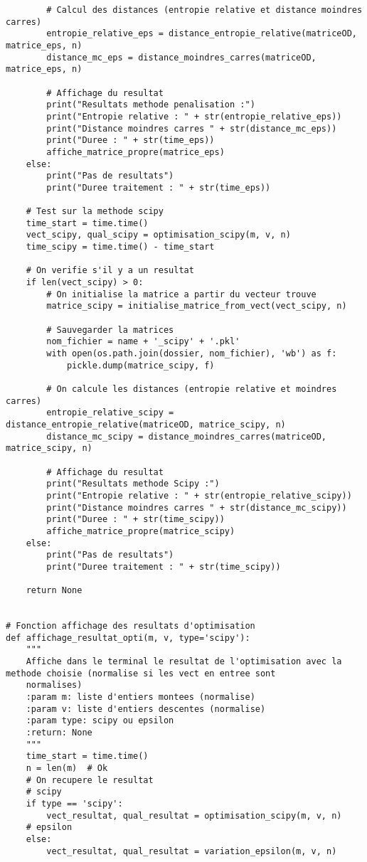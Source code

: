 \documentclass[12pt]{article}
\begin{document}
\begin{lstlisting}
        # Calcul des distances (entropie relative et distance moindres carres)
        entropie_relative_eps = distance_entropie_relative(matriceOD, matrice_eps, n)
        distance_mc_eps = distance_moindres_carres(matriceOD, matrice_eps, n)

        # Affichage du resultat
        print("Resultats methode penalisation :")
        print("Entropie relative : " + str(entropie_relative_eps))
        print("Distance moindres carres " + str(distance_mc_eps))
        print("Duree : " + str(time_eps))
        affiche_matrice_propre(matrice_eps)
    else:
        print("Pas de resultats")
        print("Duree traitement : " + str(time_eps))

    # Test sur la methode scipy
    time_start = time.time()
    vect_scipy, qual_scipy = optimisation_scipy(m, v, n)
    time_scipy = time.time() - time_start

    # On verifie s'il y a un resultat
    if len(vect_scipy) > 0:
        # On initialise la matrice a partir du vecteur trouve
        matrice_scipy = initialise_matrice_from_vect(vect_scipy, n)

        # Sauvegarder la matrices
        nom_fichier = name + '_scipy' + '.pkl'
        with open(os.path.join(dossier, nom_fichier), 'wb') as f:
            pickle.dump(matrice_scipy, f)

        # On calcule les distances (entropie relative et moindres carres)
        entropie_relative_scipy = distance_entropie_relative(matriceOD, matrice_scipy, n)
        distance_mc_scipy = distance_moindres_carres(matriceOD, matrice_scipy, n)

        # Affichage du resultat
        print("Resultats methode Scipy :")
        print("Entropie relative : " + str(entropie_relative_scipy))
        print("Distance moindres carres " + str(distance_mc_scipy))
        print("Duree : " + str(time_scipy))
        affiche_matrice_propre(matrice_scipy)
    else:
        print("Pas de resultats")
        print("Duree traitement : " + str(time_scipy))

    return None


# Fonction affichage des resultats d'optimisation
def affichage_resultat_opti(m, v, type='scipy'):
    """
    Affiche dans le terminal le resultat de l'optimisation avec la methode choisie (normalise si les vect en entree sont
    normalises)
    :param m: liste d'entiers montees (normalise)
    :param v: liste d'entiers descentes (normalise)
    :param type: scipy ou epsilon
    :return: None
    """
    time_start = time.time()
    n = len(m)  # Ok
    # On recupere le resultat
    # scipy
    if type == 'scipy':
        vect_resultat, qual_resultat = optimisation_scipy(m, v, n)
    # epsilon
    else:
        vect_resultat, qual_resultat = variation_epsilon(m, v, n)


\end{lstlisting}
\end{document}
